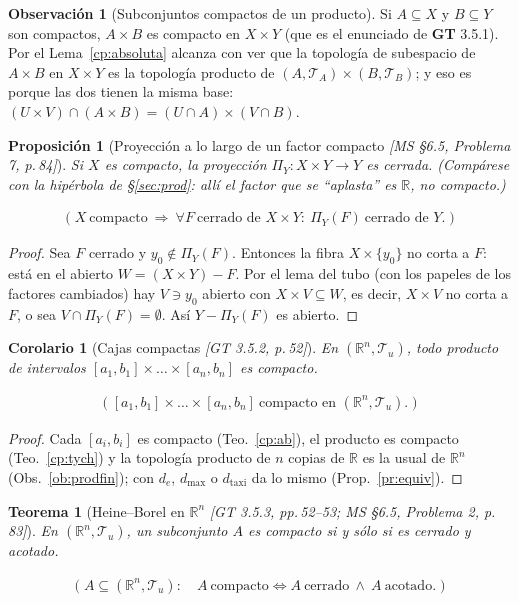 \documentclass[11pt,a4paper]{article}
\newcommand{\lgc}[1]{\par\vspace{-3pt}\begin{gather*}\big(\;#1\;\big)\end{gather*}\vspace{-6pt}}
\theoremstyle{definition}
\newtheorem{observacion}[definicion]{Observación}
\theoremstyle{plain}
\newtheorem{teorema}[definicion]{Teorema}
\newtheorem{proposicion}[definicion]{Proposición}
\newtheorem{corolario}[definicion]{Corolario}
\newcommand{\fnt}[1]{{\normalfont\small\itshape\color{gray!150!black}[#1]}}
\newcommand{\R}{\mathbb{R}}
\newcommand{\tp}{\mathcal{T}}
\begin{document}
\begin{observacion}[Subconjuntos compactos de un producto]
Si $A\subseteq X$ y $B\subseteq Y$ son compactos, $A\times B$ es compacto en $X\times Y$ (que es el enunciado de \textbf{GT} 3.5.1). Por el Lema~\ref{cp:absoluta} alcanza con ver que la topología de subespacio de $A\times B$ en $X\times Y$ es la topología producto de $(A,\tp_A)\times(B,\tp_B)$; y eso es porque las dos tienen la misma base: $(U\times V)\cap(A\times B)=(U\cap A)\times(V\cap B)$.
\end{observacion}

\begin{proposicion}[Proyección a lo largo de un factor compacto \fnt{MS \S6.5, Problema 7, p.\,84}]\label{cp:proycerr}
Si $X$ es compacto, la proyección $\Pi_Y:X\times Y\to Y$ es cerrada. (Compárese con la hipérbola de \S\ref{sec:prod}: allí el factor que se ``aplasta'' es $\R$, no compacto.)
\lgc{X\ \text{compacto}\ \Rightarrow\ \forall F\ \text{cerrado de } X\times Y:\ \Pi_Y(F)\ \text{cerrado de } Y.}
\end{proposicion}

\begin{proof}
Sea $F$ cerrado y $y_0\notin\Pi_Y(F)$. Entonces la fibra $X\times\{y_0\}$ no corta a $F$: está en el abierto $W=(X\times Y)-F$. Por el lema del tubo (con los papeles de los factores cambiados) hay $V\ni y_0$ abierto con $X\times V\subseteq W$, es decir, $X\times V$ no corta a $F$, o sea $V\cap\Pi_Y(F)=\emptyset$. Así $Y-\Pi_Y(F)$ es abierto.
\end{proof}

\begin{corolario}[Cajas compactas \fnt{GT 3.5.2, p.\,52}]\label{cp:cajas}
En $(\R^n,\tp_u)$, todo producto de intervalos $[a_1,b_1]\times\dots\times[a_n,b_n]$ es compacto.
\lgc{[a_1,b_1]\times\dots\times[a_n,b_n]\ \text{compacto en } (\R^n,\tp_u).}
\end{corolario}

\begin{proof}
Cada $[a_i,b_i]$ es compacto (Teo.~\ref{cp:ab}), el producto es compacto (Teo.~\ref{cp:tych}) y la topología producto de $n$ copias de $\R$ es la usual de $\R^n$ (Obs.~\ref{ob:prodfin}); con $d_e$, $d_{\max}$ o $d_{\text{taxi}}$ da lo mismo (Prop.~\ref{pr:equiv}).
\end{proof}

\begin{teorema}[Heine--Borel en $\R^n$ \fnt{GT 3.5.3, pp.\,52--53; MS \S6.5, Problema 2, p.\,83}]\label{cp:HB}
En $(\R^n,\tp_u)$, un subconjunto $A$ es compacto si y sólo si es cerrado y acotado.
\lgc{A\subseteq(\R^n,\tp_u):\quad A\ \text{compacto}\iff A\ \text{cerrado}\ \wedge\ A\ \text{acotado}.}
\end{teorema}
\end{document}

